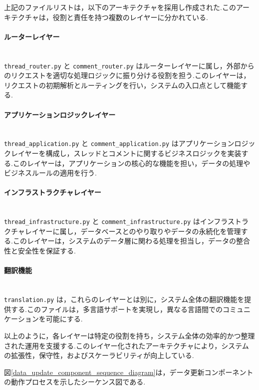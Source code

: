 \documentclass[b5paper,12pt,dvipdfmx]{jsreport}
\newcommand{\red}[1]{\textcolor{red}{#1}}
\begin{document}

上記のファイルリストは，以下のアーキテクチャを採用し作成された.このアーキテクチャは，役割と責任を持つ複数のレイヤーに分かれている.

\paragraph{ルーターレイヤー}\mbox{}\\
\texttt{thread\_router.py} と \texttt{comment\_router.py} はルーターレイヤーに属し，外部からのリクエストを適切な処理ロジックに振り分ける役割を担う.このレイヤーは，リクエストの初期解析とルーティングを行い，システムの入口点として機能する.

\paragraph{アプリケーションロジックレイヤー}\mbox{}\\
\texttt{thread\_application.py} と \texttt{comment\_application.py} はアプリケーションロジックレイヤーを構成し，スレッドとコメントに関するビジネスロジックを実装する.このレイヤーは，アプリケーションの核心的な機能を担い，データの処理やビジネスルールの適用を行う.

\paragraph{インフラストラクチャレイヤー}\mbox{}\\
\texttt{thread\_infrastructure.py} と \texttt{comment\_infrastructure.py} はインフラストラクチャレイヤーに属し，データベースとのやり取りやデータの永続化を管理する.このレイヤーは，システムのデータ層に関わる処理を担当し，データの整合性と安全性を保証する.

\paragraph{翻訳機能}\mbox{}\\
\texttt{translation.py} は，これらのレイヤーとは別に，システム全体の翻訳機能を提供する.このファイルは，多言語サポートを実現し，異なる言語間でのコミュニケーションを可能にする.

以上のように，各レイヤーは特定の役割を持ち，システム全体の効率的かつ整理された運用を支援する.このレイヤー化されたアーキテクチャにより，システムの拡張性，保守性，およびスケーラビリティが向上している.


図\ref{data_update_component_sequence_diagram}は，データ更新コンポーネントの動作プロセスを示したシーケンス図である.
\end{document}
